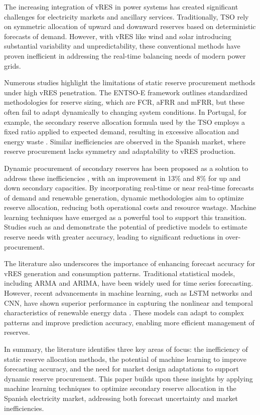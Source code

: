 The increasing integration of \gls{vRES} in power systems has created significant challenges for electricity markets and ancillary services. Traditionally, \gls{TSO} rely on symmetric allocation of upward and downward reserves based on deterministic forecasts of demand. However, with \gls{vRES} like wind and solar introducing substantial variability and unpredictability, these conventional methods have proven inefficient in addressing the real-time balancing needs of modern power grids.\par
Numerous studies highlight the limitations of static reserve procurement methods under high vRES penetration. The \gls{ENTSO-E} framework \cite{handbook2009policy} outlines standardized methodologies for reserve sizing, which are \gls{FCR}, \gls{aFRR} and \gls{mFRR}, but these often fail to adapt dynamically to changing system conditions. In Portugal, for example, the secondary reserve allocation formula used by the \gls{TSO} employs a fixed ratio applied to expected demand, resulting in excessive allocation and energy waste %
. Similar inefficiencies are observed in the Spanish market, where reserve procurement lacks symmetry and adaptability to \gls{vRES} production.\par %
Dynamic procurement of secondary reserves has been proposed as a solution to address these inefficiencies \cite{Algarvio2022}, with an improvement in 13\% and 8\% for up and down secondary capacities. By incorporating real-time or near real-time forecasts of demand and renewable generation, dynamic methodologies aim to optimize reserve allocation, reducing both operational costs and resource wastage. Machine learning techniques have emerged as a powerful tool to support this transition. Studies such as \cite{DeVos2019} and \cite{Kruse2022} demonstrate the potential of predictive models to estimate reserve needs with greater accuracy, leading to significant reductions in over-procurement.\par
The literature also underscores the importance of enhancing forecast accuracy for \gls{vRES} generation and consumption patterns. Traditional statistical models, including ARMA and ARIMA, have been widely used for time series forecasting. However, recent advancements in machine learning, such as \gls{LSTM} networks and \gls{CNN}, have shown superior performance in capturing the nonlinear and temporal characteristics of renewable energy data \cite{Benti2023}. These models can adapt to complex patterns and improve prediction accuracy, enabling more efficient management of reserves.\par
In summary, the literature identifies three key areas of focus: the inefficiency of static reserve allocation methods, the potential of machine learning to improve forecasting accuracy, and the need for market design adaptations to support dynamic reserve procurement. This paper builds upon these insights by applying machine learning techniques to optimize secondary reserve allocation in the Spanish electricity market, addressing both forecast uncertainty and market inefficiencies.\par